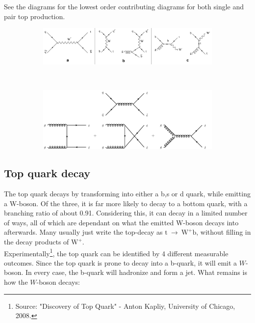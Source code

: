\documentclass[11pt,a4paper]{article}
\begin{document}
See the diagrams for the lowest order contributing diagrams for both single and pair top production.

\begin{figure}[h]
	\centering
	\begin{subfigure}[h]{1\textwidth}
		\includegraphics[width=\textwidth]{single_Top_channels_0.jpg}
		\label{Top_single}
	\end{subfigure}
	~
	\begin{subfigure}[h]{1\textwidth}
		\includegraphics[width=\textwidth]{top_pair_production.png}
		\label{Top_pair}
	\end{subfigure}
\end{figure}

\subsection{Top quark decay}
The top quark decays by transforming into either a b,s or d quark, while emitting a W-boson. Of the three, it is far more likely to decay to a bottom quark, with a branching ratio of about 0.91. Considering this, it can decay in a limited number of ways, all of which are dependant on what the emitted W-boson decays into afterwards. Many usually just write the top-decay as $\text{t} \:\rightarrow\: \text{W}^+\text{b}$, without filling in the decay products of $\text{W}^+$.\\

Experimentally\footnote{Source: "Discovery of Top Quark" - Anton Kapliy, University of Chicago, 2008.}, the top quark can be identified by 4 different measurable outcomes. Since the top quark is prone to decay into a b-quark, it will emit a $W$-boson. In every case, the b-quark will hadronize and form a jet. What remains is how the $W$-boson decays:
\end{document}
